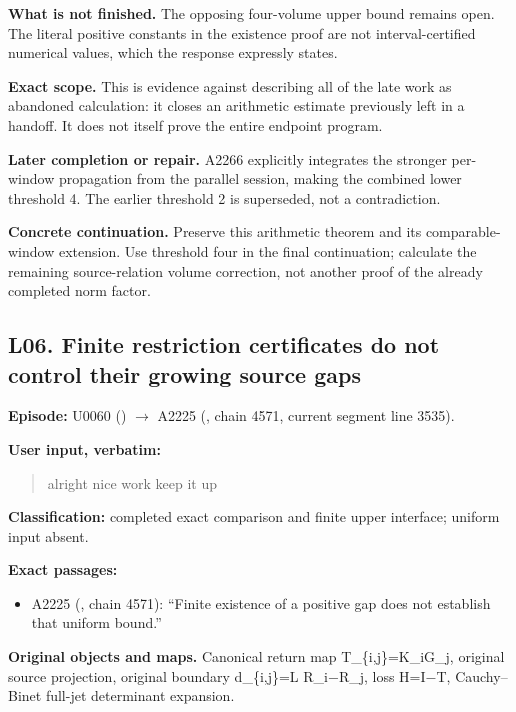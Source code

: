 \documentclass[10pt,a4paper,oneside]{report}
\providecommand{\tightlist}{\setlength{\itemsep}{0pt}\setlength{\parskip}{0pt}}
\begin{document}
\textbf{What is not finished.} The opposing four-volume upper bound
remains open. The literal positive constants in the existence proof are
not interval-certified numerical values, which the response expressly
states.

\textbf{Exact scope.} This is evidence against describing all of the
late work as abandoned calculation: it closes an arithmetic estimate
previously left in a handoff. It does not itself prove the entire
endpoint program.

\textbf{Later completion or repair.} A2266 explicitly integrates the
stronger per-window propagation from the parallel session, making the
combined lower threshold 4. The earlier threshold 2 is superseded, not a
contradiction.

\textbf{Concrete continuation.} Preserve this arithmetic theorem and its
comparable-window extension. Use threshold four in the final
continuation; calculate the remaining source-relation volume correction,
not another proof of the already completed norm factor.

\subsection{L06. Finite restriction certificates do not control their
growing source
gaps}\label{l06.-finite-restriction-certificates-do-not-control-their-growing-source-gaps}

\textbf{Episode:} U0060
(\protect{})
\allowbreak{}\ensuremath{→}\allowbreak{} A2225
(\protect{}, chain 4571,
current segment line 3535).

\textbf{User input, verbatim:}

\begin{quote}
alright nice work keep it up
\end{quote}

\textbf{Classification:} completed exact comparison and finite upper
interface; uniform input absent.

\textbf{Exact passages:}

\begin{itemize}
\tightlist
\item
  A2225 (\protect{}, chain
  4571): ``Finite existence of a positive gap does not establish that
  uniform bound.''
\end{itemize}

\textbf{Original objects and maps.} Canonical return map
T\_\{i,j\}=K\_iG\_j, original source projection, original boundary
d\_\{i,j\}=L R\_i\allowbreak{}\ensuremath{−}\allowbreak{}R\_j, loss
H=I\allowbreak{}\ensuremath{−}\allowbreak{}T, Cauchy--Binet full-jet
determinant expansion.
\end{document}
